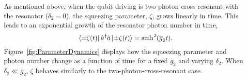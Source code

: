 
As mentioned above, when the qubit driving is two-photon-cross-resonant with the resonator ($\delta_2=0$), the squeezing parameter, $\zeta$, grows linearly in time. This leads to an exponential growth of the resonator photon number in time,
\begin{align}
    \bra{\pm \zeta(t)}\hat{a}^\dagger \hat{a}\ket{\pm\zeta(t)}=\sinh^2(\overline{g}_2t).
\end{align}
Figure~\ref{fig:ParameterDynamics} displays how the squeezing parameter and photon number change as a function of time for a fixed $\overline{g}_2$ and varying $\delta_2$. When $\delta_2 \ll \overline{g}_2$, $\zeta$ behaves similarly to the two-photon-cross-resonant case.



